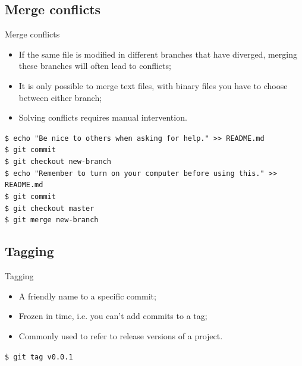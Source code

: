 \documentclass{beamer}
\begin{document}
\subsection{Merge conflicts}
\begin{frame}{Merge conflicts}
  \begin{itemize}
    \item If the same file is modified in different branches that have diverged, merging these branches will often lead to conflicts;
    \item It is only possible to merge text files, with binary files you have to choose between either branch;
    \item Solving conflicts requires manual intervention.
  \end{itemize}
  \begin{block}{}
    \texttt{\$ echo "Be nice to others when asking for help." >> README.md} \\
    \texttt{\$ git commit} \\
    \texttt{\$ git checkout new-branch} \\
    \texttt{\$ echo "Remember to turn on your computer before using this." >> README.md} \\
    \texttt{\$ git commit} \\
    \texttt{\$ git checkout master} \\
    \texttt{\$ git merge new-branch}
  \end{block}
\end{frame}

\subsection{Tagging}
\begin{frame}{Tagging}
  \begin{itemize}
    \item A friendly name to a specific commit;
    \item Frozen in time, i.e. you can't add commits to a tag;
    \item Commonly used to refer to release versions of a project.
  \end{itemize}
  \begin{block}{}
    \texttt{\$ git tag v0.0.1}
  \end{block}
\end{frame}
\end{document}
